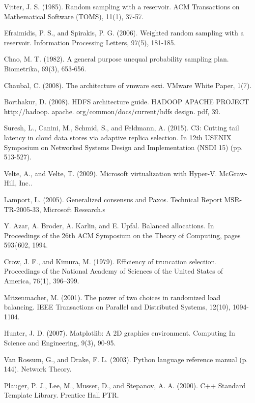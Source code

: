 \documentclass[12pt]{article}
\begin{document}
\begin{thebibliography}{99}
    Vitter, J. S. (1985). Random sampling with a reservoir. ACM Transactions on Mathematical Software (TOMS), 11(1), 37-57.

    Efraimidis, P. S., and Spirakis, P. G. (2006). Weighted random sampling with a reservoir. Information Processing Letters, 97(5), 181-185.

    Chao, M. T. (1982). A general purpose unequal probability sampling plan.  Biometrika, 69(3), 653-656.

    Chaubal, C. (2008). The architecture of vmware esxi. VMware White Paper, 1(7).

    Borthakur, D. (2008). HDFS architecture guide. HADOOP APACHE PROJECT http://hadoop. apache. org/common/docs/current/hdfs design. pdf, 39.

    Suresh, L., Canini, M., Schmid, S., and Feldmann, A. (2015). C3: Cutting tail latency in cloud data stores via adaptive replica selection. In 12th USENIX Symposium on Networked Systems Design and Implementation (NSDI 15) (pp. 513-527).

    Velte, A., and Velte, T. (2009). Microsoft virtualization with Hyper-V. McGraw-Hill, Inc..

    Lamport, L. (2005). Generalized consensus and Paxos. Technical Report MSR-TR-2005-33, Microsoft Research.s

    Y. Azar, A. Broder, A. Karlin, and E. Upfal. Balanced allocations. In Proceedings of the 26th ACM Symposium on the Theory of Computing, pages 593\{602, 1994.

    Crow, J. F., and Kimura, M. (1979). Efficiency of truncation selection. Proceedings of the National Academy of Sciences of the United States of America, 76(1), 396–399.

    Mitzenmacher, M. (2001). The power of two choices in randomized load balancing. IEEE Transactions on Parallel and Distributed Systems, 12(10), 1094-1104.

    Hunter, J. D. (2007). Matplotlib: A 2D graphics environment. Computing In Science and Engineering, 9(3), 90-95.

    Van Rossum, G., and Drake, F. L. (2003). Python language reference manual (p. 144). Network Theory.

    Plauger, P. J., Lee, M., Musser, D., and Stepanov, A. A. (2000). C++ Standard Template Library. Prentice Hall PTR.


\end{thebibliography}
\end{document}
